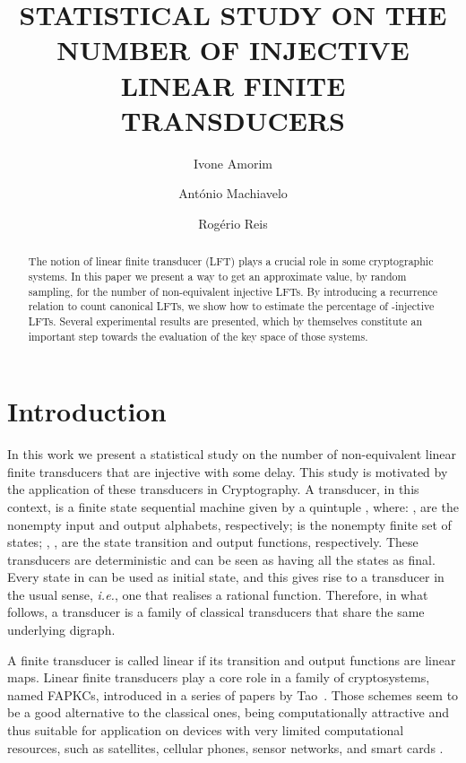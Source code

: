 \documentclass{ocg}
\newcommand{\LFT}{LFT}
\begin{document}
\title{STATISTICAL STUDY ON THE NUMBER OF INJECTIVE LINEAR FINITE TRANSDUCERS}
\author[e]{Ivone Amorim} 
\author[z]{Ant\'onio
  Machiavelo} 
\author[e]{Rog\'erio Reis} 
\address{CMUP, Faculdade de
  Ci\^encias da Universidade do Porto, Portugal} 
\address[e]{
  }
\address[z]{}
\maketitle
\begin{abstract}
The notion of linear finite transducer (\LFT{}) plays a crucial role in some cryptographic systems. In this paper we present a way to get an approximate value, by random sampling, for the number of non-equivalent injective LFTs.   By introducing a recurrence relation to count canonical \LFT{}s, we show how to estimate the percentage of -injective \LFT{}s. Several experimental results are presented, which by themselves constitute an important step towards the evaluation of the key space of those systems.
\end{abstract}
\thispagestyle{empty}
\section{Introduction}

In this work we present a statistical study on the number of
non-equivalent linear finite transducers that are injective with some delay. This study
is motivated by the application of these transducers in
Cryptography. A transducer, in this context, is a finite state
sequential machine given by a quintuple
, where:
,  are the nonempty input and output
alphabets, respectively;  is the nonempty finite set of states;
, , are the state transition and output functions,
respectively. These transducers are deterministic and can be seen as
having all the states as final. Every state in  can be used as
initial state, and this gives rise to a transducer in the usual sense,
\textit{i.e.}, one that realises a rational function. Therefore, in
what follows, a transducer is a family of classical transducers that
share the same underlying digraph.

A finite transducer is called linear if its transition and output functions
are linear maps.  Linear finite transducers play a core role in a family of
cryptosystems, named FAPKCs, introduced in a series of papers by
Tao~\cite{TaoChen1985,TaoChenChen1997,TaoChen1997,TaoChen1999}. Those
schemes seem to be a good alternative to the classical ones, being
computationally attractive and thus suitable for application on
devices with very limited computational resources, such as satellites,
cellular phones, sensor networks, and smart cards \cite{TaoChen1997}.
\end{document}
